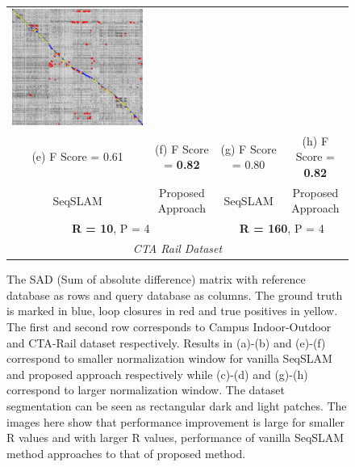 \documentclass[twocolumn]{article}
\begin{document}
\begin{figure}[!htbp]
\begin{tabular*}{\textwidth}{cccc}
  \includegraphics[width=\imgW,height=\imgH]{cta-rail-with-good-310} \\
  (e) F Score = 0.61 & (f) F Score = \textbf{0.82} & (g) F Score = 0.80 & (h) F Score = \textbf{0.82} \\
  SeqSLAM & Proposed Approach & SeqSLAM & Proposed Approach \\
  \multicolumn{2}{c}{\textbf{R = 10}, P = 4} & \multicolumn{2}{c}{\textbf{R = 160}, P = 4} \\
  \multicolumn{4}{c}{\emph{CTA Rail Dataset}} \\
 \end{tabular*}
 \caption{The SAD (Sum of absolute difference) matrix with reference database as rows and query database as columns. The ground truth is marked in blue, loop closures in red and true positives in yellow. The first and second row corresponds to Campus Indoor-Outdoor and CTA-Rail dataset respectively. Results in (a)-(b) and (e)-(f) correspond to smaller normalization window for vanilla SeqSLAM and proposed approach respectively while (c)-(d) and (g)-(h) correspond to larger normalization window. The dataset segmentation can be seen as rectangular dark and light patches. The images here show that performance improvement is large for smaller R values and with larger R values, performance of vanilla SeqSLAM method approaches to that of proposed method.}
 \label{fig:sadMat}

\end{figure}
\end{document}
